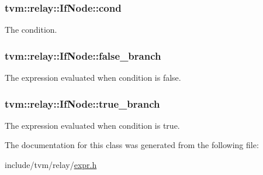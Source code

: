 \subsubsection[{\texorpdfstring{cond}{cond}}]{ tvm\+::relay\+::\+If\+Node\+::cond}\hypertarget{classtvm_1_1relay_1_1IfNode_a8cd1fc508da901b65c306cb4e76b0643}{}\label{classtvm_1_1relay_1_1IfNode_a8cd1fc508da901b65c306cb4e76b0643}


The condition. 

\subsubsection[{\texorpdfstring{false\+\_\+branch}{false_branch}}]{ tvm\+::relay\+::\+If\+Node\+::false\+\_\+branch}\hypertarget{classtvm_1_1relay_1_1IfNode_ae6a504717890d97b574b93dba29e2641}{}\label{classtvm_1_1relay_1_1IfNode_ae6a504717890d97b574b93dba29e2641}


The expression evaluated when condition is false. 

\subsubsection[{\texorpdfstring{true\+\_\+branch}{true_branch}}]{ tvm\+::relay\+::\+If\+Node\+::true\+\_\+branch}\hypertarget{classtvm_1_1relay_1_1IfNode_abbda9637de8fac5d227ef7c305e5f34e}{}\label{classtvm_1_1relay_1_1IfNode_abbda9637de8fac5d227ef7c305e5f34e}


The expression evaluated when condition is true. 



The documentation for this class was generated from the following file\+:\begin{DoxyCompactItemize}
\item 
include/tvm/relay/\hyperlink{relay_2expr_8h}{expr.\+h}\end{DoxyCompactItemize}
